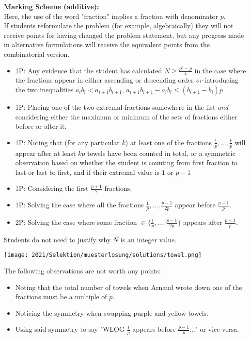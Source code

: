 \bigskip

\textbf{Marking Scheme (additive):}\\
Here, the use of the word "fraction" implies a fraction with denominator $p$. \\
If students reformulate the problem (for example, algebraically) they will not receive points for having changed the problem statement, but any progress made in alternative formulations will receive the equivalent points from the combinatorial version. 
\begin{itemize}
\item 1P: Any evidence that the student has calculated $N \ge \frac{p^3-p}{4}$ in the case where the fractions appear in either ascending or descending order \emph{or} introducing the two inequalities $a_ib_i < a_{i+1}b_{i+1}$, $a_{i+1}b_{i+1} - a_ib_i \le (b_{i+1}-b_i)p$
\item 1P: Placing one of the two extremal fractions somewhere in the list \emph{and} considering either the maximum or minimum of the sets of fractions either before or after it. 
\item 1P: Noting that (for any particular $k$) at least one of the fractions $\frac{1}{p}, \dots, \frac{k}{p}$ will appear after at least $kp$ towels have been counted in total, or a symmetric observation based on whether the student is counting from first fraction to last or last to first, and if their extremal value is $1$ or $p-1$
\item 1P: Considering the first $\frac{p+1}{2}$ fractions.
\item 1P: Solving the case where all the fractions $\frac{1}{p}, \dots, \frac{p-1}{2p}$ appear before $\frac{p-1}{p}$.
\item 2P: Solving the case where some fraction $\in \{ \frac{1}{p}, \dots, \frac{p-1}{2p} \}$ appears after $\frac{p-1}{p}$. 
\end{itemize}
Students do not need to justify why $N$ is an integer value. 

\begin{center}
   \texttt{[image: 2021/Selektion/muesterlosung/solutions/towel.png]}
\end{center}

The following observations are not worth any points: 
\begin{itemize}
    \item Noting that the total number of towels when Arnaud wrote down one of the fractions must be a multiple of $p$.
    \item Noticing the symmetry when swapping purple and yellow towels.
    \item Using said symmetry to say "WLOG $\frac{1}{p}$ appears before $\frac{p-1}{p}$..." or vice versa.
\end{itemize}